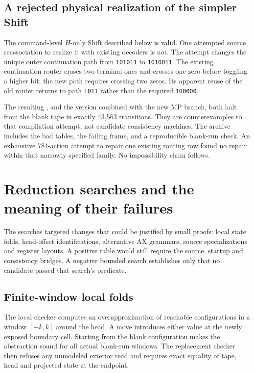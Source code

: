 \documentclass[11pt,a4paper]{article}
\newcommand{\code}[1]{\texttt{#1}}
\begin{document}
\subsection{A rejected physical realization of the simpler Shift}

The command-level $H$-only Shift described below is valid. One attempted
source reassociation to realize it with existing decoders is not. The
attempt changes the unique outer continuation path from \code{101011}
to \code{1010011}. The existing continuation router erases two terminal
ones and crosses one zero before toggling a higher bit; the new path
requires crossing two zeros. Its apparent reuse of the old router returns
to path \code{1011} rather than the required \code{100000}.

The resulting , and the version combined
with the new MP branch, both halt from the blank tape in exactly
43,563 transitions. They are counterexamples to that compilation attempt,
not candidate consistency machines. The archive includes the bad tables,
the failing frame, and a reproducible blank-run check. An exhaustive
784-action attempt to repair one existing routing row found no repair
within that narrowly specified family. No impossibility claim follows.




\section{Reduction searches and the meaning of their failures}

The searches targeted changes that could be justified by small proofs:
local state folds, head-offset identifications, alternative AX grammars,
source specializations and register layouts. A positive table would still
require the source, startup and consistency bridges. A negative bounded
search establishes only that no candidate passed that search's predicate.

\subsection{Finite-window local folds}

The local checker computes an overapproximation of reachable configurations
in a window $[-k,k]$ around the head. A move introduces either value at
the newly exposed boundary cell. Starting from the blank configuration
makes the abstraction sound for all actual blank-run windows. The
replacement checker then refuses any unmodeled exterior read and requires
exact equality of tape, head and projected state at the endpoint.
\end{document}
